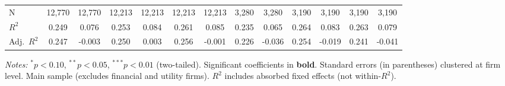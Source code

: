 \documentclass[11pt,a4paper]{article}
\begin{document}
\begin{table}[htbp]
\begin{tabular}{lcccccccccccc}
\midrule
N & 12,770 & 12,770 & 12,213 & 12,213 & 12,213 & 12,213 & 3,280 & 3,280 & 3,190 & 3,190 & 3,190 & 3,190 \\
$R^2$ & 0.249 & 0.076 & 0.253 & 0.084 & 0.261 & 0.085 & 0.235 & 0.065 & 0.264 & 0.083 & 0.263 & 0.079 \\
Adj.~$R^2$ & 0.247 & -0.003 & 0.250 & 0.003 & 0.256 & -0.001 & 0.226 & -0.036 & 0.254 & -0.019 & 0.241 & -0.041 \\
\bottomrule
\end{tabular}
\begin{minipage}{\linewidth}
\vspace{2pt}\scriptsize
\textit{Notes:} $^{*}p<0.10$, $^{**}p<0.05$, $^{***}p<0.01$ (two-tailed).
 Significant coefficients in \textbf{bold}.
 Standard errors (in parentheses) clustered at firm level.
 Main sample (excludes financial and utility firms).
 $R^2$ includes absorbed fixed effects (not within-$R^2$).
\end{minipage}
\end{table}
\clearpage
\end{document}
